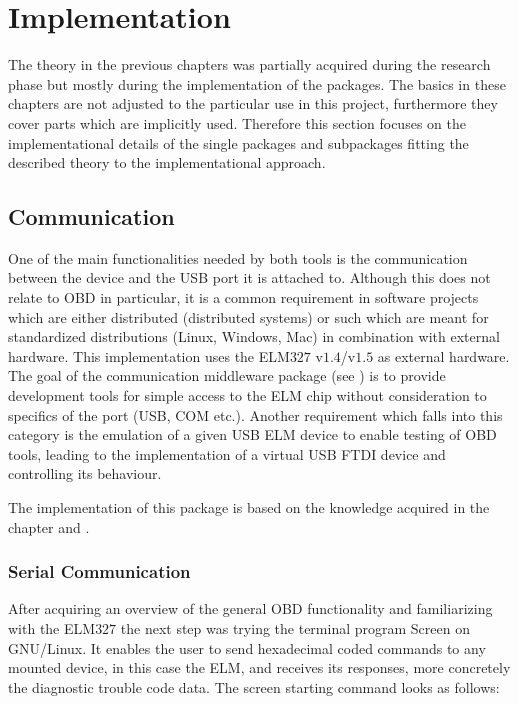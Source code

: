
\chapter{Implementation}
\label{sec:impl}
The theory in the previous chapters was partially acquired during the research phase but mostly during the implementation of the packages. 
The basics in these chapters are not adjusted to the particular use in this project, furthermore they cover parts which are implicitly used. 
Therefore this section focuses on the implementational details of the single packages and subpackages fitting the described theory to the 
implementational approach.

\section{Communication}
\label{sec:comm}
One of the main functionalities needed by both tools is the communication between the device and the USB port it is attached to. Although this does not relate 
to OBD in particular, it is a common requirement in software projects which are either distributed (distributed systems) or such which are 
meant for standardized distributions (Linux, Windows, Mac) in combination with external hardware. This implementation uses the ELM$327$ v$1.4$/v$1.5$ \cite{ELM} 
as external hardware. The goal of the communication middleware package (see ) is to provide development tools for simple access 
to the ELM chip without consideration to specifics of the port (USB, COM etc.). Another requirement which falls into this category is the emulation 
of a given USB ELM device to enable testing of OBD tools, leading to the implementation of a virtual USB FTDI device and controlling its behaviour.

The implementation of this package is based on the knowledge acquired in the chapter  and .

\subsection{Serial Communication}
\label{sec:serialComm}
After acquiring an overview of the general OBD functionality and familiarizing with the ELM$327$ the next step was trying the terminal program 
Screen \cite{SCREEN} on GNU/Linux. It enables the user to send hexadecimal coded commands to any mounted device, in this case the ELM, and receives its responses, 
more concretely the diagnostic trouble code data. The screen starting command looks as follows:

